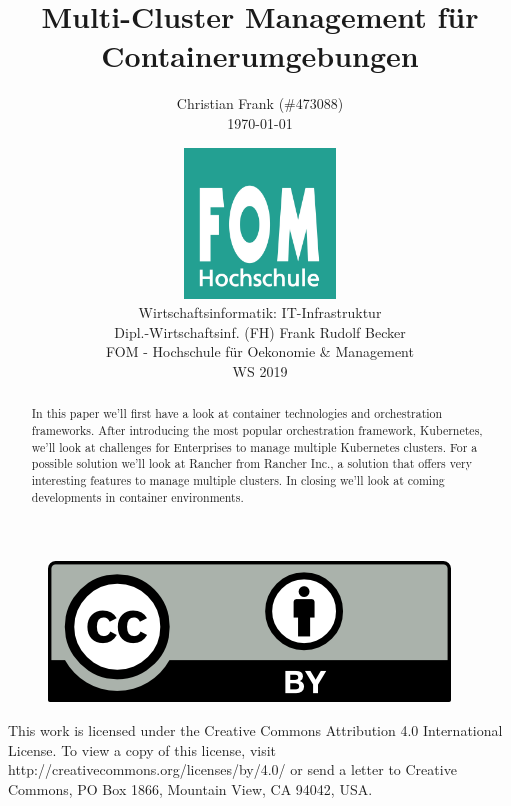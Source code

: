 \documentclass[12pt,a4paper,listof=totoc,bibliography=totoc]{scrartcl}
\newcommand\svthema{Multi-Cluster Management für Containerumgebungen}
\newcommand\svperson{Christian Frank (\#473088)}
\newcommand\svdatum{\today}
\newcommand\lvname{Wirtschaftsinformatik: IT-Infrastruktur}
\newcommand\lvtyp{WS 2019}
\newcommand\lvinst{FOM - Hochschule für Oekonomie \& Management}
\newcommand\lvbetr{Dipl.-Wirtschaftsinf. (FH) Frank Rudolf Becker}
\begin{document}
\title{ \huge\textbf{\svthema} }
\author{ {\svperson} \\ \svdatum }
\date{ \normalsize \centering \includegraphics[width=0.3\textwidth]{FOM}\\ {\lvname} \\ {\lvbetr} \\ {\lvinst} \\ {\lvtyp} }

\pagestyle{fancy}
\fancyhf{}
\fancyhf[ch]{\thepage}
\renewcommand\headrulewidth{0pt}

\maketitle
\thispagestyle{empty} %

\begin{abstract}
In this paper we'll first have a look at container technologies and orchestration frameworks. After introducing the most popular orchestration framework, Kubernetes, we'll look at challenges for Enterprises to manage multiple Kubernetes clusters.
For a possible solution we'll look at Rancher from Rancher Inc., a solution that offers very interesting features to manage multiple clusters. In closing we'll look at coming developments in container environments.

\end{abstract}

\vfill
\begin{figure}[h]
    \centering
    \includegraphics[]{CC-BY}
\end{figure}

This work is licensed under the Creative Commons Attribution 4.0 International License. To view a copy of this license, visit http://creativecommons.org/licenses/by/4.0/ or send a letter to Creative Commons, PO Box 1866, Mountain View, CA 94042, USA.
\end{document}
